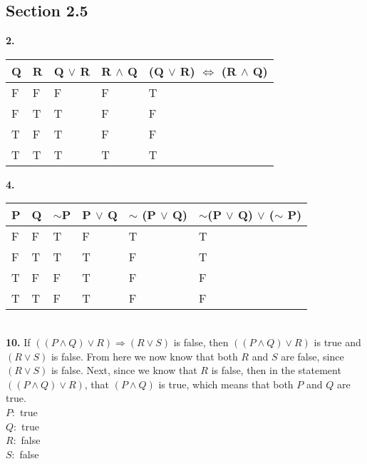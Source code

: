 \documentclass[12pt]{article}
\begin{document}
\subsection*{Section 2.5}
\textbf{2.}
\begin{table}[!h]
\centering
\begin{tabular}{|l|l|l|l|l|}
\hline
Q & R & Q $\lor$ R & R $\land$ Q & (Q $\lor$ R) $\iff$ (R $\land$ Q) \\ \hline
F & F & F          & F           & T                                 \\ \hline
F & T & T          & F           & F                                 \\ \hline
T & F & T          & F           & F                                 \\ \hline
T & T & T          & T           & T                                 \\ \hline
\end{tabular}
\end{table}
\newpage
\textbf{4.}
\begin{table}[!h]
\centering
\begin{tabular}{|l|l|l|l|l|l|}
\hline
\textbf{P} & \textbf{Q} & \textbf{$\sim$P} & \textbf{P $\lor$ Q} & \textbf{$\sim$ (P $\lor$ Q)} & \textbf{$\sim$(P $\lor$ Q) $\lor$ ($\sim$ P)} \\ \hline
F          & F          & T                & F                   & T                          & T                                             \\ \hline
F          & T          & T                & T                   & F                          & T                                             \\ \hline
T          & F          & F                & T                   & F                          & F                                             \\ \hline
T          & T          & F                & T                   & F                          & F                                             \\ \hline
\end{tabular}
\end{table}\\
\textbf{10.} If $((P \land Q) \lor R) \Rightarrow (R \lor S)$ is false, then $((P \land Q) \lor R)$ is true and $(R \lor S)$ is false. From here we now know that both $R$ and $S$ are false, since $(R \lor S)$ is false. Next, since we know that $R$ is false, then in the statement $((P \land Q) \lor R)$, that $(P \land Q)$ is true, which means that both $P$ and $Q$ are true.\\
$P:$ true\\
$Q:$ true\\
$R:$ false\\
$S:$ false
\end{document}
